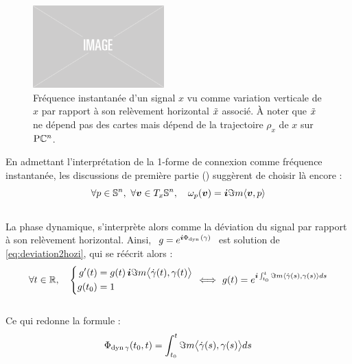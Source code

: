 \begin{figure}[h]
	\includegraphics[width=0.45\textwidth]{fig/placeholder}
	\caption[Interprétation géométrique de la fréquence instantanée]
	{Fréquence instantanée d'un signal $x$ vu comme variation verticale de $x$ par rapport à son relèvement horizontal $\Tilde{x}$ associé. À noter que $\Tilde{x}$ ne dépend pas des cartes mais dépend de la trajectoire $\rho_x$ de $x$ sur $\PC{n}$.}
	\label{fig:freq_inst-Vgeodiff}
\end{figure}

En admettant l'interprétation de la 1-forme de connexion comme fréquence instantanée, les discussions de première partie () suggèrent de choisir là encore :
\begin{equation} \label{eq:conn2SUPC}
\forall p\in\S{n},\ \forall \bf{v}\in\tg[x]{\S{n}},\quad \conn_p(\bf{v}) = \i\Im m \langle \bf{v}, p\rangle
\end{equation}
\\
La phase dynamique, s'interprète alors comme la déviation du signal par rapport à son relèvement horizontal. Ainsi, $\ g = e^{\i \phased(\gamma)}\ $ est solution de \eqref{eq:deviation2hozi}, qui se réécrit alors :
\[\forall t\in\R,\quad \left\{ \begin{aligned}
g'(t)  &= g(t)\, \i\Im m \big\langle \dot{\gamma}(t) , \gamma(t) \big\rangle \\
g(t_0) &= 1
\end{aligned}\ \right. \Llr\ g(t) = e^{\i  \int_{t_0}^t \Im m\langle \dot{\gamma}(s) , \gamma(s) \rangle ds}\]
\\
Ce qui redonne la formule :
\begin{equation}\label{eq:phased_vgeodiff}
\phased[\gamma](t_0, t) = \int_{t_0}^t \Im m\big\langle \dot{\gamma}(s) , \gamma(s) \big\rangle ds
\end{equation}
\skipl

